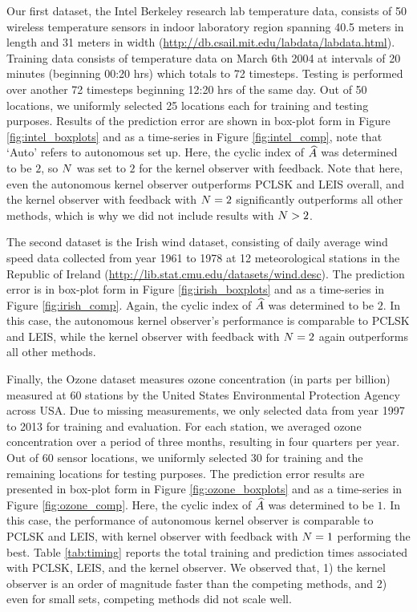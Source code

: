 Our first dataset, the Intel Berkeley research lab temperature data, consists of 50 wireless temperature sensors in indoor laboratory region spanning 40.5 meters in length and 31 meters in width ({\url{http://db.csail.mit.edu/labdata/labdata.html}}). Training data consists of temperature data on March 6th 2004 at intervals of 20 minutes (beginning 00:20 hrs) which totals to 72 timesteps. Testing is performed over another 72 timesteps beginning 12:20 hrs of the same day. Out of 50 locations, we uniformly selected 25 locations each for training and testing purposes. Results of the prediction error are shown in box-plot form in Figure \ref{fig:intel_boxplots} and as a time-series in Figure \ref{fig:intel_comp}, note that `Auto' refers to autonomous set up. Here, the cyclic index of $\widehat{A}$ was determined to be $2$, so $N$ was set to $2$ for the kernel observer with feedback. Note that here, even the autonomous kernel observer outperforms PCLSK and LEIS overall, and the kernel observer with feedback with $N = 2$ significantly outperforms all other methods, which is why we did not include results with $N > 2$. 


The second dataset is the Irish wind dataset, consisting of daily average
wind speed %
data collected from year
1961 to 1978 at 12 meteorological stations in the Republic
of Ireland ({\url{http://lib.stat.cmu.edu/datasets/wind.desc}}). The prediction error  is in box-plot form in Figure \ref{fig:irish_boxplots} and as a time-series in Figure \ref{fig:irish_comp}. Again, the cyclic index of $\widehat{A}$ was determined to be $2$. In this case, the autonomous kernel observer's performance is comparable to PCLSK and LEIS, while the kernel observer with feedback with $N = 2$ again outperforms all other methods. 

Finally, the Ozone dataset measures ozone concentration (in parts per billion) measured at 60 stations by the United States Environmental Protection Agency \cite{li2006spatiotemporal} across USA. Due to missing measurements, we only selected data from
year 1997 to 2013 for training and evaluation. For each station, we averaged ozone concentration over a period of three months, resulting in four quarters per year.
Out of 60 sensor locations, we uniformly selected 30 for training and the remaining locations for testing purposes. The prediction error results are presented in box-plot form in Figure \ref{fig:ozone_boxplots} and as a time-series in Figure \ref{fig:ozone_comp}. Here, the cyclic index of $\widehat{A}$ was determined to be $1$. In this case, the performance of autonomous kernel observer is comparable to PCLSK and LEIS, with kernel observer with feedback with $N = 1$ performing the best. Table \ref{tab:timing} reports the total training and prediction times associated with PCLSK, LEIS, and the kernel observer. We observed that, 1) the kernel observer is an order of magnitude faster than the competing methods, and 2) even for small sets, competing methods did not scale well.


